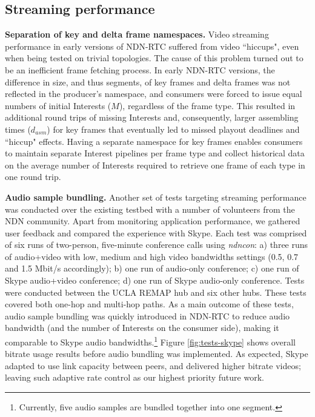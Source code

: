 \documentclass{icn/sig-alternate-2013} %
\newcommand{\ndnrtcName}{NDN-RTC} %
\newcommand{\ndnconName}{\emph{ndncon}}
\begin{document}
\subsection{Streaming performance}

\textbf{Separation of key and delta frame namespaces.} Video streaming performance in early versions of \ndnrtcName{} suffered from video ``hiccups", even when being tested on trivial topologies. The cause of this problem turned out to be an inefficient frame fetching process. In early \ndnrtcName{} versions, the difference in size, and thus segments, of key frames and delta frames was not reflected in the producer's namespace, and consumers were forced to issue equal numbers of initial Interests ($M$), regardless of the frame type. This resulted in additional round trips of missing Interests and, consequently, larger assembling times ($d_{asm}$) for key frames that eventually led to missed playout deadlines and ``hiccup" effects. Having a separate namespace for key frames enables consumers to maintain separate Interest pipelines per frame type and collect historical data on the average number of Interests required to retrieve one frame of each type in one round trip. 

\textbf{Audio sample bundling.}
Another set of tests targeting streaming performance was conducted over the existing testbed with a number of volunteers from the NDN community. Apart from monitoring application performance, we gathered user feedback and compared the experience with Skype. 
Each test was comprised of six runs of two-person, five-minute conference calls using \ndnconName{}: a) three runs of audio+video with low, medium and high video bandwidths settings (0.5, 0.7 and 1.5 Mbit/s accordingly); b) one run of audio-only conference; c) one run of Skype audio+video conference; d) one run of Skype audio-only conference. Tests were conducted between the UCLA REMAP hub and six other hubs. These tests covered both one-hop and multi-hop paths. 
As a main outcome of these tests, audio sample bundling was quickly introduced in \ndnrtcName{} to reduce audio bandwidth (and the number of Interests on the consumer side), making it comparable to Skype audio bandwidths.\footnote{Currently, five audio samples are bundled together into one segment.} Figure \ref{fig:tests-skype} shows overall bitrate usage results before audio bundling was implemented. As expected, Skype adapted to use link capacity between peers, and delivered higher bitrate videos; leaving such adaptive rate control as our highest priority future work. %
\end{document}
